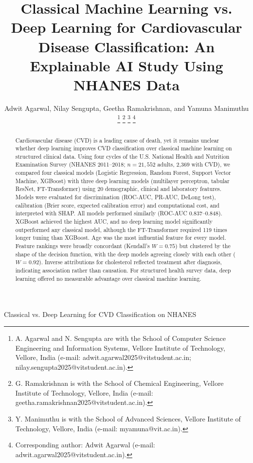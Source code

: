 \documentclass[journal]{IEEEtran}
\begin{document}
\title{Classical Machine Learning vs. Deep Learning for Cardiovascular Disease Classification: An Explainable AI Study Using NHANES Data}

\author{Adwit Agarwal, Nilay Sengupta, Geetha Ramakrishnan, and Yamuna Manimuthu%
\thanks{A. Agarwal and N. Sengupta are with the School of Computer Science Engineering and Information Systems, Vellore Institute of Technology, Vellore, India (e-mail: adwit.agarwal2025@vitstudent.ac.in; nilay.sengupta2025@vitstudent.ac.in).}%
\thanks{G. Ramakrishnan is with the School of Chemical Engineering, Vellore Institute of Technology, Vellore, India (e-mail: geetha.ramakrishnan2025@vitstudent.ac.in).}%
\thanks{Y. Manimuthu is with the School of Advanced Sciences, Vellore Institute of Technology, Vellore, India (e-mail: myamuna@vit.ac.in).}%
\thanks{Corresponding author: Adwit Agarwal (e-mail: adwit.agarwal2025@vitstudent.ac.in).}}

%
{Classical vs. Deep Learning for CVD Classification on NHANES}

\maketitle

\begin{abstract}
Cardiovascular disease (CVD) is a leading cause of death, yet it remains unclear whether deep learning improves CVD classification over classical machine learning on structured clinical data. Using four cycles of the U.S. National Health and Nutrition Examination Survey (NHANES 2011--2018; $n = 21{,}552$ adults, 2{,}369 with CVD), we compared four classical models (Logistic Regression, Random Forest, Support Vector Machine, XGBoost) with three deep learning models (multilayer perceptron, tabular ResNet, FT-Transformer) using 20 demographic, clinical and laboratory features. Models were evaluated for discrimination (ROC-AUC, PR-AUC, DeLong test), calibration (Brier score, expected calibration error) and computational cost, and interpreted with SHAP. All models performed similarly (ROC-AUC 0.837--0.848). XGBoost achieved the highest AUC, and no deep learning model significantly outperformed any classical model, although the FT-Transformer required 119 times longer tuning than XGBoost. Age was the most influential feature for every model. Feature rankings were broadly concordant (Kendall's $W = 0.75$) but clustered by the shape of the decision function, with the deep models agreeing closely with each other ($W = 0.92$). Inverse attributions for cholesterol reflected treatment after diagnosis, indicating association rather than causation. For structured health survey data, deep learning offered no measurable advantage over classical machine learning.
\end{abstract}
\end{document}
